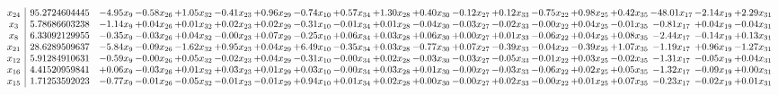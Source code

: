 \documentclass[9pt]{article}
\begin{document}
 \[\begin{array}{c| c c@{\hskip 2pt} c@{\hskip 2pt} c@{\hskip 2pt} c@{\hskip 2pt} c@{\hskip 2pt} c@{\hskip 2pt} c@{\hskip 2pt} c@{\hskip 2pt} c@{\hskip 2pt} c@{\hskip 2pt} c@{\hskip 2pt} c@{\hskip 2pt} c@{\hskip 2pt} c@{\hskip 2pt} c@{\hskip 2pt} c@{\hskip 2pt} c@{\hskip 2pt} }
 x_{24}   &  95.2724604445 & -4.95 x_{9} & -0.58 x_{26} & +  1.05 x_{32} & -0.41 x_{23} & +  0.96 x_{29} & -0.74 x_{10} & +  0.57 x_{34} & +  1.30 x_{28} & +  0.40 x_{30} & -0.12 x_{27} & +  0.12 x_{33} & -0.75 x_{22} & +  0.98 x_{25} & +  0.42 x_{35} & -48.01 x_{17} & -2.14 x_{19} & +  2.29 x_{31}\\
 x_{3}   &  5.78686603238 & -1.14 x_{9} & +  0.04 x_{26} & +  0.01 x_{32} & +  0.02 x_{23} & +  0.02 x_{29} & -0.31 x_{10} & -0.01 x_{34} & +  0.01 x_{28} & -0.04 x_{30} & -0.03 x_{27} & -0.02 x_{33} & -0.00 x_{22} & +  0.04 x_{25} & -0.01 x_{35} & -0.81 x_{17} & +  0.04 x_{19} & -0.04 x_{31}\\
 x_{8}   &  6.33092129955 & -0.35 x_{9} & -0.03 x_{26} & +  0.04 x_{32} & -0.00 x_{23} & +  0.07 x_{29} & -0.25 x_{10} & +  0.06 x_{34} & +  0.03 x_{28} & +  0.06 x_{30} & +  0.00 x_{27} & +  0.01 x_{33} & -0.06 x_{22} & +  0.04 x_{25} & +  0.08 x_{35} & -2.44 x_{17} & -0.14 x_{19} & +  0.13 x_{31}\\
 x_{21}   &  28.6289509637 & -5.84 x_{9} & -0.09 x_{26} & -1.62 x_{32} & +  0.95 x_{23} & +  0.04 x_{29} & +  6.49 x_{10} & -0.35 x_{34} & +  0.03 x_{28} & -0.77 x_{30} & +  0.07 x_{27} & -0.39 x_{33} & -0.04 x_{22} & -0.39 x_{25} & +  1.07 x_{35} & -1.19 x_{17} & +  0.96 x_{19} & -1.27 x_{31}\\
 x_{12}   &  5.91284910631 & -0.59 x_{9} & -0.00 x_{26} & +  0.05 x_{32} & -0.02 x_{23} & +  0.04 x_{29} & -0.31 x_{10} & -0.00 x_{34} & +  0.02 x_{28} & -0.03 x_{30} & -0.03 x_{27} & -0.05 x_{33} & -0.01 x_{22} & +  0.03 x_{25} & -0.02 x_{35} & -1.31 x_{17} & -0.05 x_{19} & +  0.04 x_{31}\\
 x_{16}   &  4.41520959841 & +  0.06 x_{9} & -0.03 x_{26} & +  0.01 x_{32} & +  0.03 x_{23} & +  0.01 x_{29} & +  0.03 x_{10} & -0.00 x_{34} & +  0.03 x_{28} & +  0.01 x_{30} & -0.00 x_{27} & -0.03 x_{33} & -0.06 x_{22} & +  0.02 x_{25} & +  0.05 x_{35} & -1.32 x_{17} & -0.09 x_{19} & +  0.00 x_{31}\\
 x_{15}   &  1.71253592023 & -0.77 x_{9} & -0.01 x_{26} & -0.05 x_{32} & -0.01 x_{23} & -0.01 x_{29} & +  0.94 x_{10} & +  0.01 x_{34} & +  0.02 x_{28} & +  0.00 x_{30} & -0.00 x_{27} & +  0.02 x_{33} & -0.00 x_{22} & +  0.01 x_{25} & +  0.07 x_{35} & -0.23 x_{17} & -0.02 x_{19} & +  0.01 x_{31}\\

\end{array}\]
\end{document}

